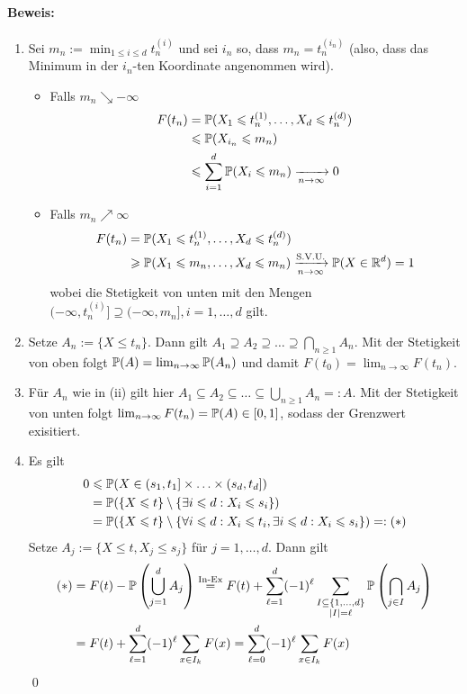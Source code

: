 \paragraph{Beweis:}
\begin{enumerate}[label=(\roman*)]
    \item Sei $m_n:=\displaystyle\min_{1\leq i\leq d}t_n^{(i)}$ und sei $i_n$ so, dass $m_n=t_n^{(i_n)}$ (also, dass das Minimum in der $i_n$-ten Koordinate angenommen wird). 
    \begin{itemize}
        \item Falls $m_n\searrow-\infty$
        \begin{align*}
            F(t_n)&=\Pp(X_1\leq t_n^{(1)},\hdots,X_d\leq t_n^{(d)})\\
            &\leq\Pp(X_{i_n}\leq m_n)\\
            &\leq\sum_{i=1}^d\Pp(X_i\leq m_n)\nto{}{n\to\infty}0
        \end{align*}
        \item Falls $m_n\nearrow\infty$
        \begin{align*}
            F(t_n)&=\Pp(X_1\leq t_n^{(1)},\hdots,X_d\leq t_n^{(d)})\\
            &\geq\Pp(X_1\leq m_n,\hdots,X_d\leq m_n)\nto{\text{S.V.U.}}{n\to\infty}\Pp(X\in\R^d)=1
        \end{align*}
        wobei die Stetigkeit von unten mit den Mengen $(-\infty,t_n^{(i)}]\supseteq(-\infty,m_n],i=1,\hdots,d$ gilt. 
    \end{itemize}
    \item Setze $A_n:=\{X\leq t_n\}$. Dann gilt $A_1\supseteq A_2\supseteq\hdots\supseteq\bigcap_{n\geq1}A_n$. Mit der Stetigkeit von oben folgt $\mathbb{P}(A)=\lim_{n\to\infty}\mathbb{P}(A_n)$ und damit $F(t_0)=\lim_{n\to\infty}F(t_n)$.
    \item F\"ur $A_n$ wie in (ii) gilt hier $A_1\subseteq A_2\subseteq\hdots\subseteq\bigcup_{n\geq1}A_n=:A$. Mit der Stetigkeit von unten folgt $\lim_{n\to\infty}F(t_n)=\mathbb{P}(A)\in[0,1]$, sodass der Grenzwert exisitiert. 
    \item Es gilt
    \begin{align*}
        0&\leqslant\mathbb{P}(X\in(s_1,t_1]\times\hdots\times(s_d,t_d])\\
        &=\mathbb{P}(\{X\leqslant t\}\setminus\{\exists i\leqslant d: X_i\leqslant s_i\})\\
        &=\mathbb{P}(\{X\leqslant t\}\setminus\{\forall i\leqslant d:X_i\leqslant t_i,\exists i\leqslant d: X_i\leqslant s_i\})=:(*)
    \end{align*}
    Setze $A_j:=\{X\leq t,X_j\leq s_j\}$ f\"ur $j=1,\hdots,d$. Dann gilt
    \begin{align*}
        (*)&=F(t)-\mathbb{P}\left(\bigcup_{j=1}^d A_j\right)\overset{\text{In-Ex}}{=}F(t)+\sum_{\ell=1}^d(-1)^\ell\sum_{\substack{I\subseteq\{1,\hdots,d\}\\|I|=\ell}}\mathbb{P}\left(\bigcap_{j\in I}A_j\right)\\
        &=F(t)+\sum_{\ell=1}^d(-1)^\ell\sum_{x\in I_k}F(x)=\sum_{\ell=0}^d(-1)^\ell\sum_{x\in I_k}F(x)
    \end{align*}
    \qed
\end{enumerate}

